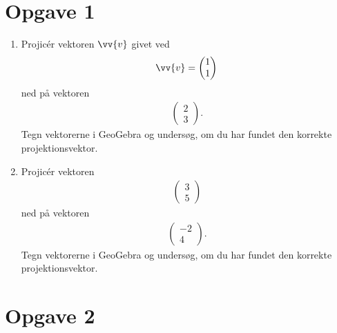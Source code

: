 \section*{Opgave 1}
\begin{enumerate}[label=\roman*)]
	\item Projicér vektoren $\vv{v}$ givet ved
	\begin{align*}
		\vv{v} = 
		\begin{pmatrix}
			1 \\ 1
		\end{pmatrix}
	\end{align*} ned på vektoren
	\begin{align*}
		\begin{pmatrix}
			2 \\ 3
		\end{pmatrix}.
	\end{align*}
	Tegn vektorerne i GeoGebra og undersøg, om du har fundet den korrekte projektionsvektor. 
	\item Projicér vektoren 
	\begin{align*}
		\begin{pmatrix}
			3\\5
		\end{pmatrix}
	\end{align*}
	ned på vektoren 
	\begin{align*}
		\begin{pmatrix}
			-2 \\ 4
		\end{pmatrix}.
	\end{align*}
	Tegn vektorerne i GeoGebra og undersøg, om du har fundet den korrekte projektionsvektor.
\end{enumerate}


\section*{Opgave 2}

